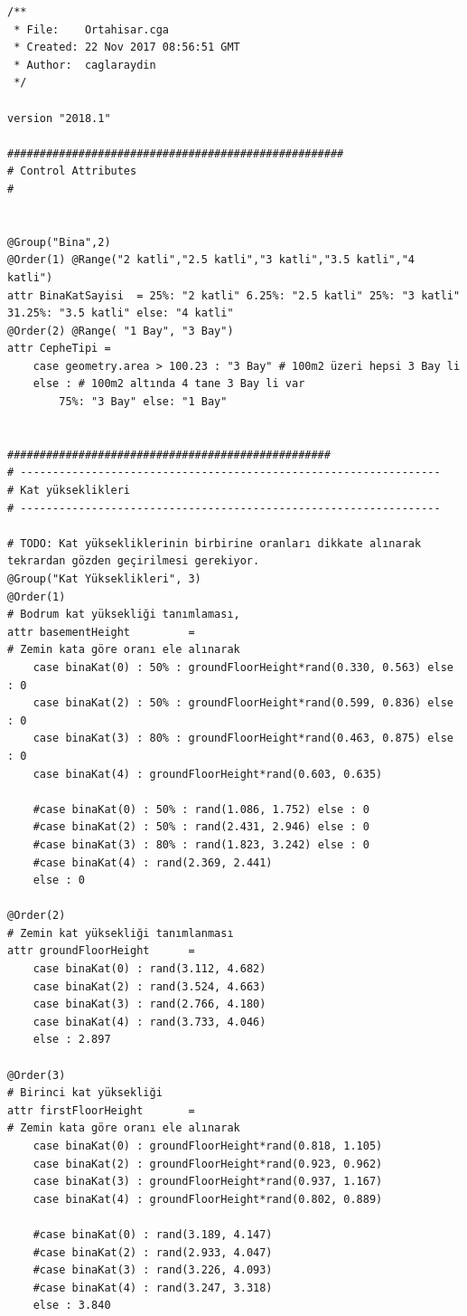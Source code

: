 \documentclass[12pt,turkish,a4paperpaper,]{report}
\begin{document}
\begin{verbatim}
/**
 * File:    Ortahisar.cga
 * Created: 22 Nov 2017 08:56:51 GMT
 * Author:  caglaraydin
 */

version "2018.1"

####################################################
# Control Attributes
#


@Group("Bina",2)
@Order(1) @Range("2 katli","2.5 katli","3 katli","3.5 katli","4 katli")
attr BinaKatSayisi  = 25%: "2 katli" 6.25%: "2.5 katli" 25%: "3 katli" 31.25%: "3.5 katli" else: "4 katli"
@Order(2) @Range( "1 Bay", "3 Bay")
attr CepheTipi =
    case geometry.area > 100.23 : "3 Bay" # 100m2 üzeri hepsi 3 Bay li
    else : # 100m2 altında 4 tane 3 Bay li var
        75%: "3 Bay" else: "1 Bay"


##################################################
# -----------------------------------------------------------------
# Kat yükseklikleri
# -----------------------------------------------------------------

# TODO: Kat yüksekliklerinin birbirine oranları dikkate alınarak tekrardan gözden geçirilmesi gerekiyor.
@Group("Kat Yükseklikleri", 3)
@Order(1)
# Bodrum kat yüksekliği tanımlaması,
attr basementHeight         =
# Zemin kata göre oranı ele alınarak
    case binaKat(0) : 50% : groundFloorHeight*rand(0.330, 0.563) else : 0
    case binaKat(2) : 50% : groundFloorHeight*rand(0.599, 0.836) else : 0
    case binaKat(3) : 80% : groundFloorHeight*rand(0.463, 0.875) else : 0
    case binaKat(4) : groundFloorHeight*rand(0.603, 0.635)

    #case binaKat(0) : 50% : rand(1.086, 1.752) else : 0
    #case binaKat(2) : 50% : rand(2.431, 2.946) else : 0
    #case binaKat(3) : 80% : rand(1.823, 3.242) else : 0
    #case binaKat(4) : rand(2.369, 2.441)
    else : 0

@Order(2)
# Zemin kat yüksekliği tanımlanması
attr groundFloorHeight      =
    case binaKat(0) : rand(3.112, 4.682)
    case binaKat(2) : rand(3.524, 4.663)
    case binaKat(3) : rand(2.766, 4.180)
    case binaKat(4) : rand(3.733, 4.046)
    else : 2.897

@Order(3)
# Birinci kat yüksekliği
attr firstFloorHeight       =
# Zemin kata göre oranı ele alınarak
    case binaKat(0) : groundFloorHeight*rand(0.818, 1.105)
    case binaKat(2) : groundFloorHeight*rand(0.923, 0.962)
    case binaKat(3) : groundFloorHeight*rand(0.937, 1.167)
    case binaKat(4) : groundFloorHeight*rand(0.802, 0.889)

    #case binaKat(0) : rand(3.189, 4.147)
    #case binaKat(2) : rand(2.933, 4.047)
    #case binaKat(3) : rand(3.226, 4.093)
    #case binaKat(4) : rand(3.247, 3.318)
    else : 3.840


\end{verbatim}
\end{document}
